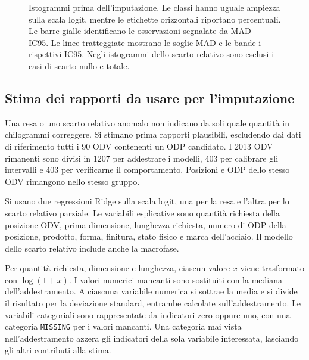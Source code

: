 \begin{figure}[H]
\centering
{}
\caption{Istogrammi prima dell'imputazione. Le classi hanno uguale ampiezza sulla scala logit, mentre le etichette orizzontali riportano percentuali. Le barre gialle identificano le osservazioni segnalate da MAD + IC95. Le linee tratteggiate mostrano le soglie MAD e le bande i rispettivi IC95. Negli istogrammi dello scarto relativo sono esclusi i casi di scarto nullo e totale.}
\label{fig:mass-outlier-distributions}
\end{figure}

\clearpage
\subsection{Stima dei rapporti da usare per l'imputazione}
\label{sec:mass-ratio-estimation}

Una resa o uno scarto relativo anomalo non indicano da soli quale quantità in chilogrammi correggere. Si stimano prima rapporti plausibili, escludendo dai dati di riferimento tutti i 90 ODV contenenti un ODP candidato. I \num{2013} ODV rimanenti sono divisi in \num{1207} per addestrare i modelli, 403 per calibrare gli intervalli e 403 per verificarne il comportamento. Posizioni e ODP dello stesso ODV rimangono nello stesso gruppo.

Si usano due regressioni Ridge sulla scala logit, una per la resa e l'altra per lo scarto relativo parziale. Le variabili esplicative sono quantità richiesta della posizione ODV, prima dimensione, lunghezza richiesta, numero di ODP della posizione, prodotto, forma, finitura, stato fisico e marca dell'acciaio. Il modello dello scarto relativo include anche la macrofase.

Per quantità richiesta, dimensione e lunghezza, ciascun valore $x$ viene trasformato con \mbox{$\log(1+x)$}. I valori numerici mancanti sono sostituiti con la mediana dell'addestramento. A ciascuna variabile numerica si sottrae la media e si divide il risultato per la deviazione standard, entrambe calcolate sull'addestramento. Le variabili categoriali sono rappresentate da indicatori zero oppure uno, con una categoria \texttt{MISSING} per i valori mancanti. Una categoria mai vista nell'addestramento azzera gli indicatori della sola variabile interessata, lasciando gli altri contributi alla stima.

